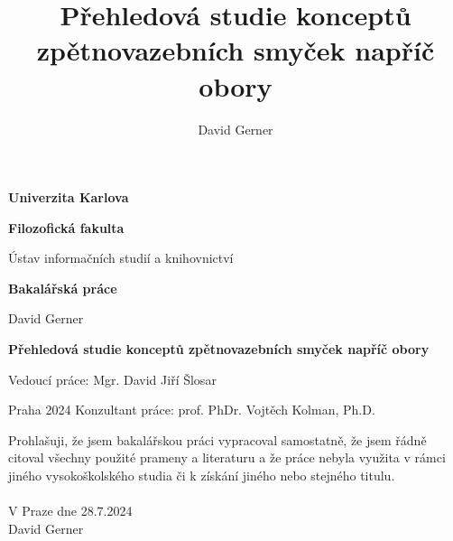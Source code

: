 \documentclass[11pt,a4paper]{article}
\author{David Gerner}
\title{Přehledová studie konceptů zpětnovazebních smyček napříč obory}
\begin{document}
\begin{titlepage}
\begin{center}
    
    \vspace*{1cm}
    \large \textbf{Univerzita Karlova}
    
    \vspace*{0.5cm}
    \textbf{Filozofická fakulta}
    
    \vspace*{0.5cm}
    Ústav informačních studií a knihovnictví

    \vspace{4cm}
    \Huge \textbf{Bakalářská práce}

    \vspace{6cm}
    \Large David Gerner
    
    \vspace{1cm}
    \huge \textbf{Přehledová studie konceptů zpětnovazebních smyček napříč obory}
  
\end{center}

\vspace*{\fill}

\hspace*{\fill}
Vedoucí práce: Mgr. David Jiří Šlosar

Praha 2024
\hspace*{\fill}
Konzultant práce: prof. PhDr. Vojtěch Kolman, Ph.D.

\end{titlepage}


\vspace*{\fill}
\noindent Prohlašuji, že jsem bakalářskou práci vypracoval samostatně, že jsem řádně citoval všechny použité prameny a literaturu a že práce nebyla využita v rámci jiného vysokoškolského studia či k získání jiného nebo stejného titulu.
\\
\\
\noindent V Praze dne 28.7.2024
\\
\hspace*{\fill} David Gerner
\\
\\
\pagebreak
\end{document}
